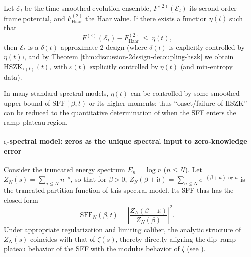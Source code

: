 \begin{proposition}\label{prop:discussion-framepotential-sff-to-hszk}
Let \(\mathcal{E}_t\) be the time-smoothed evolution ensemble, \(F^{(2)}(\mathcal{E}_t)\) its second-order frame potential, and \(F^{(2)}_{\mathrm{Haar}}\) the Haar value.
If there exists a function \(\eta(t)\) such that
\[
F^{(2)}(\mathcal{E}_t)-F^{(2)}_{\mathrm{Haar}}\ \le\ \eta(t),
\]
then \(\mathcal{E}_t\) is a \(\delta(t)\)-approximate 2-design (where \(\delta(t)\) is explicitly controlled by \(\eta(t)\)), and by Theorem \ref{thm:discussion-2design-decoupling-hszk} we obtain
\(\mathrm{HSZK}_{\varepsilon(t)}(t)\), with \(\varepsilon(t)\) explicitly controlled by \(\eta(t)\) (and min-entropy data).
\par
In many standard spectral models, \(\eta(t)\) can be controlled by some smoothed upper bound of \(\mathrm{SFF}(\beta,t)\) or its higher moments; thus ``onset/failure of HSZK'' can be reduced to the quantitative determination of when the SFF enters the ramp--plateau region.
\end{proposition}

\paragraph{\texorpdfstring{$\zeta$}{zeta}-spectral model: zeros as the unique spectral input to zero-knowledge error}
Consider the truncated energy spectrum \(E_n=\log n\) (\(n\le N\)).
Let
\(
Z_N(s)=\sum_{n\le N}n^{-s}
\), so that for \(\beta>0\),
\(
Z_N(\beta+\mathrm{i}t)=\sum_{n\le N}e^{-(\beta+\mathrm{i}t)\log n}
\)
is the truncated partition function of this spectral model.
Its SFF thus has the closed form
\[
\mathrm{SFF}_N(\beta,t)=\left|\frac{Z_N(\beta+\mathrm{i}t)}{Z_N(\beta)}\right|^2.
\]
Under appropriate regularization and limiting caliber, the analytic structure of \(Z_N(s)\) coincides with that of \(\zeta(s)\), thereby directly aligning the dip--ramp--plateau behavior of the SFF with the modulus behavior of \(\zeta\) (see \cite{BasuDasKrishnan2025AnalyticZetaRamp}).

